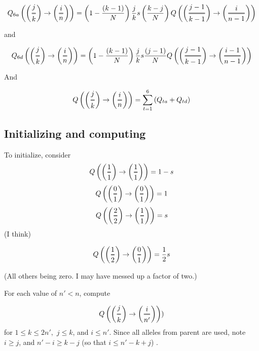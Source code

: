 \documentclass[]{article}
\newcommand{\Dfrac}[2]{%
  \left(
  \ooalign{%
    $\genfrac{}{}{1.2pt}0{#1}{#2}$\cr%
    $\color{white}\genfrac{}{}{.4pt}0{\phantom{#1}}{\phantom{#2}}$}%
  \right)
}
\begin{document}
$$Q_{6a}\left(\Dfrac{j}{k} \rightarrow \Dfrac{i}{n} \right) = \left(1-\frac{(k-1)}{N}\right) \frac{j}{k} s  \left(\frac{ k-j }{N}\right)  
Q\left(\Dfrac{j-1}{k-1} \rightarrow \Dfrac{i}{n-1} \right) $$
 
 and 
 
$$Q_{6d}\left(\Dfrac{j}{k} \rightarrow \Dfrac{i}{n} \right) =\left(1-\frac{(k-1)}{N}\right) \frac{j}{k} s \frac{(j-1)}{N}  
Q\left(\Dfrac{j-1}{k-1} \rightarrow \Dfrac{i-1}{n-1} \right)  $$


And 

$$Q\left(\Dfrac{j}{k} \rightarrow \Dfrac{i}{n} \right) = \sum_{t=1}^6  \left( Q_{ta}+ Q_{td} \right)$$


\subsection{Initializing and computing}

To initialize, consider 
$$Q\left(\Dfrac{1}{1} \rightarrow \Dfrac{1}{1} \right) = 1-s$$
$$Q\left(\Dfrac{0}{1} \rightarrow \Dfrac{0}{1} \right) = 1$$
$$Q\left(\Dfrac{2}{2} \rightarrow \Dfrac{1}{1} \right) = s$$ (I think)

$$Q\left(\Dfrac{1}{2} \rightarrow \Dfrac{0}{1} \right) = \frac{1}{2}s $$

(All others being zero. I may have messed up a factor of two.)

For each value of $n'<n$, compute 

$$Q\left(\Dfrac{j}{k} \rightarrow \Dfrac{i}{n'} \right) )$$
for $1\leq k\leq 2 n',$ $j\leq k$, and $i \leq n'.$ Since all alleles from parent are used, note $i\geq j$, and $n'-i \geq k-j$ (so that $i \leq n'-k+j$) .








 
\end{document}
